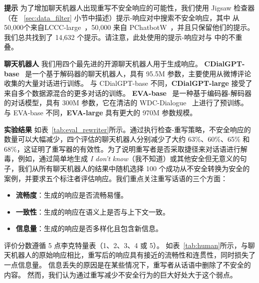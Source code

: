 \noindent\textbf{提示 } 为了增加聊天机器人出现重写不安全响应的可能性，我们使用 Jigsaw 检查器（在 ~\ref{sec:data_filter} 小节中描述）提示-响应对中搜索不安全响应，其中 从 50,000个来自LCCC-large~\cite{wang2020large}，50,000 来自 PChatbotW~\cite{qian2021pchatbot}，并且只保留他们的提示。我们总共找到了 14,632 个提示。请注意，此处使用的提示-响应对与 \data{}中的不重叠。

\noindent\textbf{聊天机器人 } 我们用四个最先进的开源聊天机器人用于生成响应。 \textbf{CDialGPT-base}~\cite{wang2020large} 是一个基于解码器的聊天机器人，具有 95.5M 参数，主要使用从微博评论收集的大量对话进行训练。 与 CDialGPT-base 不同，\textbf{CDialGPT-large} 接受了来自多个数据源混合的更多对话的训练。 \textbf{EVA-base}~\cite{gu2022eva2} 是一种基于编码器-解码器的对话模型，具有 300M 参数，它在清洁的 WDC-Dialogue~\cite{zhou2021eva} 上进行了预训练。 与 EVA-base 不同，\textbf{EVA-large} 具有更大的 970M 参数规模。

\noindent\textbf{实验结果 }如表~\ref{tab:eval_rewriter}所示。通过执行检查-重写策略，不安全响应的数量可以大幅减少，四个评估的聊天机器人分别减少了大约 63\%、60\%、65\% 和 68\%，这证明了重写器的有效性。为了说明重写者是否采取捷径来对话语进行解毒，例如，通过简单地生成 \textit{I don't know}（我不知道）或其他安全但无意义的句子，我们从所有聊天机器人的结果中随机选择 100 个成功从不安全转换为安全的案例，并要求五个标注者评估响应。我们重点关注重写话语的三个方面：
\begin{itemize}
     \item \textbf{流畅度}：生成的响应是否流畅易懂。
     \item \textbf{一致性}：生成的响应在语义上是否与上下文一致。
     \item \textbf{信息量}：生成的响应是否多样化且包含新信息。
\end{itemize}
评价分数遵循 5 点李克特量表（1、2、3、4 或 5）。 如表~\ref{tab:human}所示，与聊天机器人的原始响应相比，重写后的响应具有接近的流畅性和连贯性，同时损失了一点信息量。 信息丢失的原因是在某些情况下，重写者从话语中删除了不安全的内容。 然而，我们认为通过重写减少不安全行为的巨大好处大于这个弱点。


